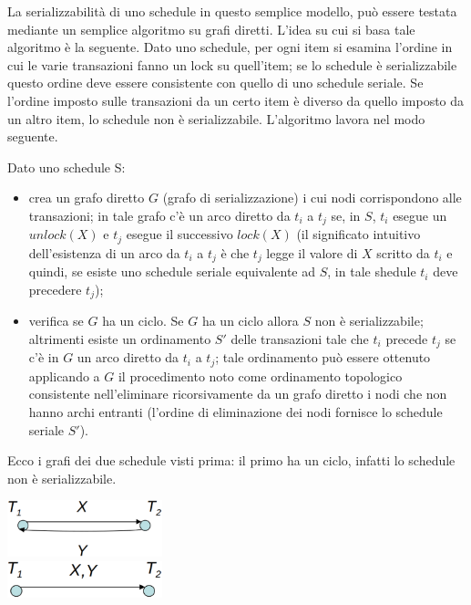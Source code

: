 La serializzabilità di uno schedule in questo semplice modello, può essere testata mediante un
semplice algoritmo su grafi diretti. L'idea su cui si basa tale algoritmo è la seguente. Dato uno
schedule, per ogni item si esamina l'ordine in cui le varie transazioni fanno un lock su quell'item; se
lo schedule è serializzabile questo ordine deve essere consistente con quello di uno schedule seriale.
Se l'ordine imposto sulle transazioni da un certo item è diverso da quello imposto da un
altro item, lo schedule non è serializzabile. L'algoritmo lavora nel modo seguente.

\begin{alg}
Dato uno schedule S:
\begin{itemize}
 \item crea un grafo diretto $G$ (grafo di serializzazione) i cui nodi corrispondono alle transazioni; in
tale grafo c'è un arco diretto da $t_i$ a $t_j$ se, in $S$, $t_i$ esegue un $unlock(X)$ e $t_j$ esegue il successivo
$lock(X)$ (il significato intuitivo dell'esistenza di un arco da $t_i$ a $t_j$ è che $t_j$ legge il valore di $X$
scritto da $t_i$ e quindi, se esiste uno schedule seriale equivalente ad $S$, in tale shedule $t_i$ deve
precedere $t_j$);
\item verifica se $G$ ha un ciclo. Se $G$ ha un ciclo allora $S$ non è serializzabile; altrimenti esiste un
ordinamento $S'$ delle transazioni tale che $t_i$ precede $t_j$ se c'è in $G$ un arco diretto da $t_i$ a $t_j$; tale
ordinamento può essere ottenuto applicando a $G$ il procedimento noto come ordinamento
topologico consistente nell'eliminare ricorsivamente da un grafo diretto i nodi che non hanno
archi entranti (l'ordine di eliminazione dei nodi fornisce lo schedule seriale $S'$).
\end{itemize}
\end{alg}

Ecco i grafi dei due schedule visti prima: il primo ha un ciclo, infatti lo schedule non è serializzabile.
\begin{multicols}{2}
 \includegraphics[width=170px]{grafo1.eps}\\
 \includegraphics[width=170px]{grafo2.eps}
\end{multicols}

